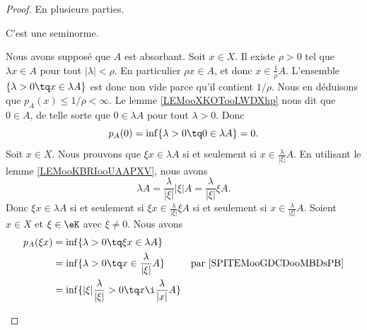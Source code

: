 \begin{proof}
	En plusieurs parties.
	\begin{proofpart}
		C'est une seminorme.
	\end{proofpart}
	\begin{subproof}
		Nous avons supposé que \( A\) est absorbant. Soit \( x\in X\). Il existe \( \rho>0\) tel que \( \lambda x\in A\) pour tout \( | \lambda |<\rho\). En particulier \( \rho x\in A\), et donc \( x\in \frac{1}{ \rho}A\). L'ensemble \( \{ \lambda >0\tq x\in \lambda A \}\) est donc non vide parce qu'il contient \( 1/\rho\). Nous en déduisons que \( p_A(x)\leq 1/\rho<\infty\).
		\spitem[\( p_A(0)=0\)]
		Le lemme \ref{LEMooXKOTooLWDXhp} nous dit que \( 0\in A\), de telle sorte que \( 0 \in \lambda A\) pour tout \( \lambda>0\). Donc
		\begin{equation}
			p_A(0)=\inf\{ \lambda >0\tq 0\in \lambda A \}=0.
		\end{equation}
				\label{SPITEMooGDCDooMBDsPB}
		Soit \( x\in X\). Nous prouvons que \( \xi x\in \lambda A\) si et seulement si \( x\in \frac{ \lambda }{ | \xi | }A\). En utilisant le lemme \ref{LEMooKBRIooUAAPXV}, nous avons
		\begin{equation}
			\lambda A=\frac{ \lambda }{ | \xi | }| \xi |A=\frac{ \lambda }{ | \xi | }\xi A.
		\end{equation}
		Donc \( \xi x\in \lambda A\) si et seulement si \( \xi x\in \frac{ \lambda }{ | \xi | }\xi A\) si et seulement si \( x\in \frac{ \lambda }{ | \xi | }A\).
		\spitem[\( p_A(\xi x)=| \xi |p_A(x)\)]
		Soient \( x\in X\) et \( \xi\in \eK\) avec \( \xi\neq 0\). Nous avons
		\begin{subequations}
			\begin{align}
				p_A(\xi x) & =\inf\{ \lambda>0\tq \xi x\in \lambda A \}                                                                                            \\
				           & =\inf\{ \lambda>0\tq x\in \frac{ \lambda }{ | \xi | }A \}                           & \text{par \ref{SPITEMooGDCDooMBDsPB}}           \\
				           & =\inf\{ | \xi |\frac{ \lambda }{ | \xi | }>0\tq x\i \frac{ \lambda }{ | x | }A \}                                                     \\

\end{align}
\end{subequations}
\end{subproof}
\end{proof}
